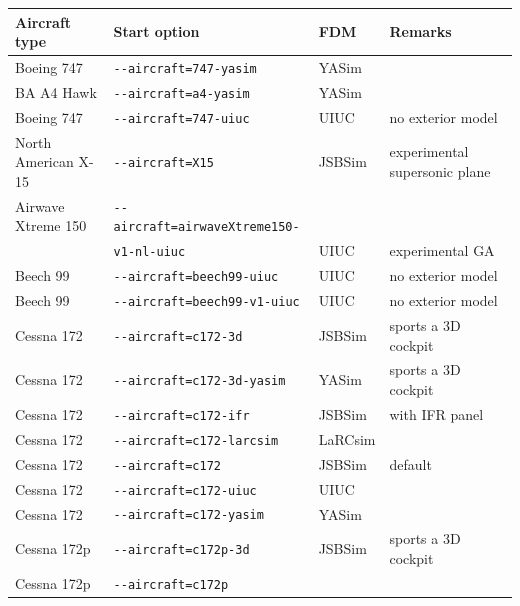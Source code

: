 \noindent
{\scriptsize
\begin{tabular}{l|l|l|l}
		Aircraft type		&   Start option								&	FDM		&		Remarks\\\hline
   Boeing 747		&		\texttt{-$ $-aircraft=747-yasim}                   
   &  YASim &           \\
   BA A4 Hawk&		\texttt{-$ $-aircraft=a4-yasim}                    
   &  YASim &           \\
   Boeing 747 					&		\texttt{-$ $-aircraft=747-uiuc}                    
   & 	UIUC & no exterior model          \\
   North American X-15		&		\texttt{-$ $-aircraft=X15}                         
   &  JSBSim & experimental supersonic plane      \\
   Airwave Xtreme 150 &		\texttt{-$ $-aircraft=airwaveXtreme150-} 
   &          \\
   													&		\texttt{v1-nl-uiuc} 
   & UIUC & experimental GA          \\
      Beech 99							&		\texttt{-$ $-aircraft=beech99-uiuc}                
   & 	 UIUC & no exterior model         \\
   Beech 99			&		\texttt{-$ $-aircraft=beech99-v1-uiuc}             
   & UIUC & no exterior model          \\
   Cessna 172 &		\texttt{-$ $-aircraft=c172-3d}                     
   & JSBSim & sports a 3D cockpit          \\
   Cessna 172	&		\texttt{-$ $-aircraft=c172-3d-yasim}               
   & 	YASim & sports a 3D cockpit          \\
   Cessna 172	&		\texttt{-$ $-aircraft=c172-ifr}                    
   & JSBSim & with IFR panel           \\
   Cessna 172						&		\texttt{-$ $-aircraft=c172-larcsim}                
   &  LaRCsim &           \\
   Cessna 172						&		\texttt{-$ $-aircraft=c172}                        
   & JSBSim & default          \\
   Cessna 172						&		\texttt{-$ $-aircraft=c172-uiuc}                   
   &  UIUC &           \\
   Cessna 172						&		\texttt{-$ $-aircraft=c172-yasim}                  
   &  YASim &           \\
   Cessna 172p	&		\texttt{-$ $-aircraft=c172p-3d}                    
   & JSBSim & sports a 3D cockpit          \\
   Cessna 172p						&		\texttt{-$ $-aircraft=c172p}                       

\end{tabular}}
